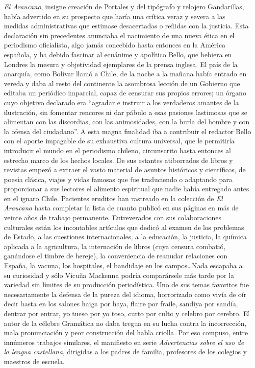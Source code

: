 \documentclass[10pt,twoside,openright]{memoir}
\begin{document}
\emph{El Araucano}, insigne creación de Portales y del tipógrafo y relojero
Gandarillas, había advertido en su prospecto que haría una crítica veraz
y severa a las medidas administrativas que estimase desacertadas o
reñidas con la justicia. Esta declaración sin precedentes anunciaba el
nacimiento de una nueva ética en el periodismo oficialista, algo jamás
concebido hasta entonces en la América española, y ha debido fascinar al
ecuánime y apolítico Bello, que bebiera en Londres la mesura y
objetividad ejemplares de la prensa inglesa. El país de la anarquía,
como Bolívar llamó a Chile, de la noche a la mañana había entrado en
vereda y daba al resto del continente la asombrosa lección de un
Gobierno que editaba un periódico imparcial, capaz de censurar sus
propios errores; un órgano cuyo objetivo declarado era ``agradar e
instruir a los verdaderos amantes de la ilustración, sin fomentar
rencores ni dar pábulo a esas pasiones lastimosas que se alimentan con
las discordias, con las animosidades, con la burla del hombre y con la
ofensa del ciudadano''. A esta magna finalidad iba a contribuir el
redactor Bello con el aporte impagable de su exhaustiva cultura
universal, que le permitiría introducir el mundo en el periodismo
chileno, circunscrito hasta entonces al estrecho marco de los hechos
locales. De sus estantes atiborrados de libros y revistas empezó a
extraer el vasto material de asuntos históricos y científicos, de poesía
clásica, viajes y vidas famosas que fue traduciendo o adaptando para
proporcionar a sus lectores el alimento espiritual que nadie había
entregado antes en el ignaro Chile. Pacientes eruditos han rastreado en
la colección de \emph{El Araucano} hasta completar la lista de cuanto publicó
en sus páginas en más de veinte años de trabajo permanente. Entreverados
con sus colaboraciones culturales están los incontables artículos que
dedicó al examen de los problemas de Estado, a las cuestiones
internacionales, a la educación, la justicia, la química aplicada a la
agricultura, la internación de libros (cuya censura combatió, ganándose
el timbre de hereje), la conveniencia de reanudar relaciones con España,
la vacuna, los hospitales, el bandidaje en los campos\ldots Nada escapaba a
su curiosidad y sólo Vicuña Mackenna podría comparársele más tarde por
la variedad sin límites de su producción periodística. Uno de sus temas
favoritos fue necesariamente la defensa de la pureza del idioma,
horrorizado como vivía de oír decir hasta en los salones haiga por haya,
flaire por fraile, sandiya por sandía, dentrar por entrar, yo tueso por
yo toso, curto por culto y celebro por cerebro. El autor de la célebre
Gramática no daba tregua en su lucha contra la incorrección, mala
pronunciación y peor construcción del habla criolla. Por eso compuso,
entre innúmeros trabajos similares, el manifiesto en serie
\emph{Advertencias sobre el uso de la lengua castellana}, dirigidas a
los padres de familia, profesores de los colegios y maestros de escuela.
\end{document}
